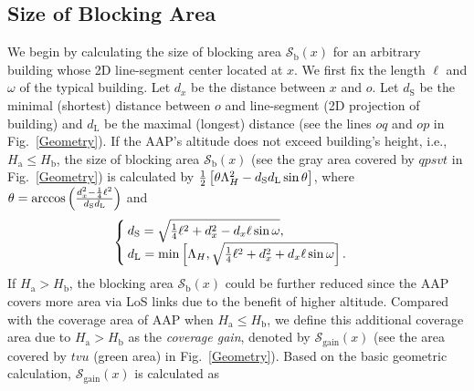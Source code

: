 \documentclass[12pt, draftclsnofoot, onecolumn]{IEEEtran}
\begin{document}
\subsection{Size of Blocking Area}
We begin by calculating the size of blocking area $\mathcal{S}_{\textrm{b}}(x)$ for an arbitrary building whose 2D line-segment center located at $x$. We first fix the length $\ell$ and $\omega$ of the typical building. Let $d_x$ be the distance between $x$ and $o$. Let $d_{\textrm{S}}$ be the minimal (shortest) distance between $o$ and line-segment (2D projection of building) and $d_{\textrm{L}}$ be the maximal (longest) distance (see the lines $oq$ and $op$ in Fig.~\ref{Geometry}).  If the AAP's altitude does not exceed building's height, i.e., $H_{\textrm{a}} \leq H_{\textrm{b}}$, the size of blocking area $\mathcal{S}_{\textrm{b}}(x)$ (see the gray area covered by $qpsvt$ in Fig.~\ref{Geometry}) is calculated by
$\frac{1}{2}\left[\theta \Lambda_H^2 - d_{\textrm{S}}d_{\textrm{L}}\sin\theta\right]$,
where $\theta = \arccos \left( \frac{d_x^2 - \frac{1}{4}\ell^2}{d_{\textrm{S}}d_{\textrm{L}}} \right)$ and
\begin{align}\label{Eq:dsdl}
\begin{cases}
d_{\textrm{S}} = \sqrt{\frac{1}{4}\ell^2 + d_x^2 - d_x\ell\sin\omega}, \\
d_{\textrm{L}} = \min\left[\Lambda_H, \sqrt{\frac{1}{4}\ell^2 + d_x^2 + d_x\ell\sin\omega}\right].
\end{cases}
\end{align}
If $H_{\textrm{a}} > H_{\textrm{b}}$, the blocking area $\mathcal{S}_{\textrm{b}}(x)$ could be further reduced since the AAP covers more area via LoS links due to the benefit of higher altitude. Compared with the coverage area of AAP when $H_{\textrm{a}} \leq H_{\textrm{b}}$,  we define this additional coverage area due to $H_{\textrm{a}} > H_{\textrm{b}}$ as the \emph{coverage gain}, denoted by $\mathcal{S}_{\textrm{gain}}(x)$ (see the area covered by $tvu$ (green area) in Fig.~\ref{Geometry}). Based on the basic geometric calculation, $\mathcal{S}_{\textrm{gain}}(x)$ is calculated as
\end{document}
